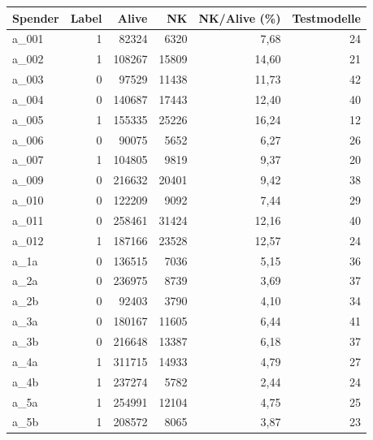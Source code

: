 \begin{tabular}{lrrrrr}
\toprule
Spender & Label & Alive & NK & NK/Alive (\%) & Testmodelle \\
\midrule
a\_001 & 1 & 82324 & 6320 & 7,68 & 24 \\
a\_002 & 1 & 108267 & 15809 & 14,60 & 21 \\
a\_003 & 0 & 97529 & 11438 & 11,73 & 42 \\
a\_004 & 0 & 140687 & 17443 & 12,40 & 40 \\
a\_005 & 1 & 155335 & 25226 & 16,24 & 12 \\
a\_006 & 0 & 90075 & 5652 & 6,27 & 26 \\
a\_007 & 1 & 104805 & 9819 & 9,37 & 20 \\
a\_009 & 0 & 216632 & 20401 & 9,42 & 38 \\
a\_010 & 0 & 122209 & 9092 & 7,44 & 29 \\
a\_011 & 0 & 258461 & 31424 & 12,16 & 40 \\
a\_012 & 1 & 187166 & 23528 & 12,57 & 24 \\
a\_1a & 0 & 136515 & 7036 & 5,15 & 36 \\
a\_2a & 0 & 236975 & 8739 & 3,69 & 37 \\
a\_2b & 0 & 92403 & 3790 & 4,10 & 34 \\
a\_3a & 0 & 180167 & 11605 & 6,44 & 41 \\
a\_3b & 0 & 216648 & 13387 & 6,18 & 37 \\
a\_4a & 1 & 311715 & 14933 & 4,79 & 27 \\
a\_4b & 1 & 237274 & 5782 & 2,44 & 24 \\
a\_5a & 1 & 254991 & 12104 & 4,75 & 25 \\
a\_5b & 1 & 208572 & 8065 & 3,87 & 23 \\
\bottomrule
\end{tabular}
